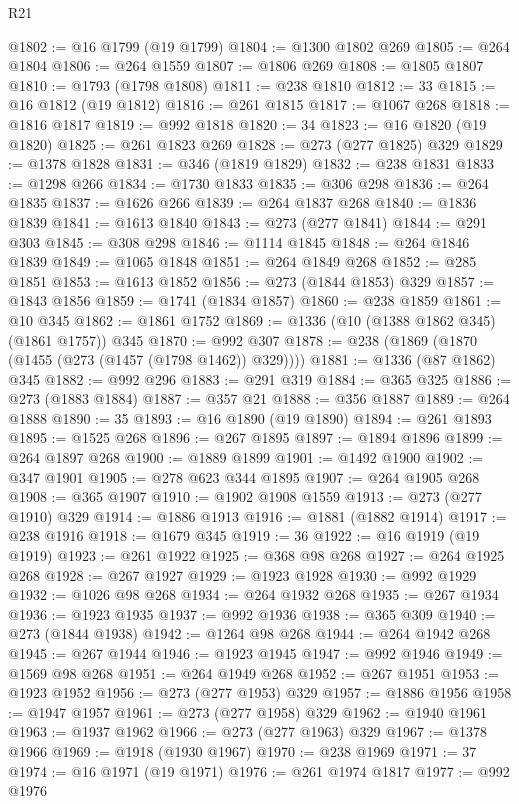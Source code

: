 \begin{lexlean}{R21}
\begin{coremodule}
{{{{{{{{{{{{{{{{{{{@1802 := @16 @1799 (@19 @1799)
@1804 := @1300 @1802 @269
@1805 := @264 @1804
@1806 := @264 @1559
@1807 := @1806 @269
@1808 := @1805 @1807
@1810 := @1793 (@1798 @1808)
@1811 := @238 @1810
@1812 := 33
@1815 := @16 @1812 (@19 @1812)
@1816 := @261 @1815
@1817 := @1067 @268
@1818 := @1816 @1817
@1819 := @992 @1818
@1820 := 34
@1823 := @16 @1820 (@19 @1820)
@1825 := @261 @1823 @269
@1828 := @273 (@277 @1825) @329
@1829 := @1378 @1828
@1831 := @346 (@1819 @1829)
@1832 := @238 @1831
@1833 := @1298 @266
@1834 := @1730 @1833
@1835 := @306 @298
@1836 := @264 @1835
@1837 := @1626 @266
@1839 := @264 @1837 @268
@1840 := @1836 @1839
@1841 := @1613 @1840
@1843 := @273 (@277 @1841)
@1844 := @291 @303
@1845 := @308 @298
@1846 := @1114 @1845
@1848 := @264 @1846 @1839
@1849 := @1065 @1848
@1851 := @264 @1849 @268
@1852 := @285 @1851
@1853 := @1613 @1852
@1856 := @273 (@1844 @1853) @329
@1857 := @1843 @1856
@1859 := @1741 (@1834 @1857)
@1860 := @238 @1859
@1861 := @10 @345
@1862 := @1861 @1752
@1869 := @1336 (@10 (@1388 @1862 @345) (@1861 @1757)) @345
@1870 := @992 @307
@1878 := @238 (@1869 (@1870 (@1455 (@273 (@1457 (@1798 @1462)) @329))))
@1881 := @1336 (@87 @1862) @345
@1882 := @992 @296
@1883 := @291 @319
@1884 := @365 @325
@1886 := @273 (@1883 @1884)
@1887 := @357 @21
@1888 := @356 @1887
@1889 := @264 @1888
@1890 := 35
@1893 := @16 @1890 (@19 @1890)
@1894 := @261 @1893
@1895 := @1525 @268
@1896 := @267 @1895
@1897 := @1894 @1896
@1899 := @264 @1897 @268
@1900 := @1889 @1899
@1901 := @1492 @1900
@1902 := @347 @1901
@1905 := @278 @623 @344 @1895
@1907 := @264 @1905 @268
@1908 := @365 @1907
@1910 := @1902 @1908 @1559
@1913 := @273 (@277 @1910) @329
@1914 := @1886 @1913
@1916 := @1881 (@1882 @1914)
@1917 := @238 @1916
@1918 := @1679 @345
@1919 := 36
@1922 := @16 @1919 (@19 @1919)
@1923 := @261 @1922
@1925 := @368 @98 @268
@1927 := @264 @1925 @268
@1928 := @267 @1927
@1929 := @1923 @1928
@1930 := @992 @1929
@1932 := @1026 @98 @268
@1934 := @264 @1932 @268
@1935 := @267 @1934
@1936 := @1923 @1935
@1937 := @992 @1936
@1938 := @365 @309
@1940 := @273 (@1844 @1938)
@1942 := @1264 @98 @268
@1944 := @264 @1942 @268
@1945 := @267 @1944
@1946 := @1923 @1945
@1947 := @992 @1946
@1949 := @1569 @98 @268
@1951 := @264 @1949 @268
@1952 := @267 @1951
@1953 := @1923 @1952
@1956 := @273 (@277 @1953) @329
@1957 := @1886 @1956
@1958 := @1947 @1957
@1961 := @273 (@277 @1958) @329
@1962 := @1940 @1961
@1963 := @1937 @1962
@1966 := @273 (@277 @1963) @329
@1967 := @1378 @1966
@1969 := @1918 (@1930 @1967)
@1970 := @238 @1969
@1971 := 37
@1974 := @16 @1971 (@19 @1971)
@1976 := @261 @1974 @1817
@1977 := @992 @1976
}}}}}}}}}}}}}}}}}}}
\end{coremodule}
\end{lexlean}
